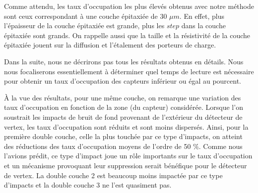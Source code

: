   \medskip
  
  Comme attendu, les taux d'occupation les plus \'elev\'es obtenus avec notre m\'ethode sont ceux correspondant \`a une couche \'epitaxi\'ee de 30 $\mu m$. En effet, plus l'\'epaisseur de la couche \'epitaxi\'ee est grande, plus les $step$ dans la couche \'epitaxi\'ee sont grands. On rappelle aussi que la taille et la r\'esistivit\'e de la couche \'epitaxi\'ee jouent sur la diffusion et l'\'etalement des porteurs de charge.
  
  \medskip
  
  Dans la suite, nous ne d\'ecrirons pas tous les r\'esultats obtenus en d\'etails. Nous nous focaliserons essentiellement \`a déterminer quel temps de lecture est n\'ecessaire pour obtenir un taux d'occupation des capteurs inf\'erieur ou \'egal au pourcent.
  
  \medskip
  
  \`A la vue des r\'esultats, pour une m\^eme couche, on remarque une variation des taux d'occupation en fonction de la zone (du capteur) consid\'er\'ee. Lorsque l'on soustrait les impacts de bruit de fond provenant de l'ext\'erieur du d\'etecteur de vertex, les taux d'occupation sont r\'eduits et sont moins dispers\'es. Ainsi, pour la premi\`ere double couche, celle la plus touch\'ee par ce type d'impacts, on atteint des r\'eductions des taux d'occupation moyens de l'ordre de 50 $\%$.  Comme nous l'avions pr\'edit, ce type d'impact joue un r\^ole importants sur le taux d'occupation et un m\'ecanisme provoquant leur suppression serait b\'en\'efique pour le d\'etecteur de vertex. La double couche 2 est beaucoup moins impact\'ee par ce type d'impacts et la double couche 3 ne l'est quasiment pas.  
  
  \medskip
  

